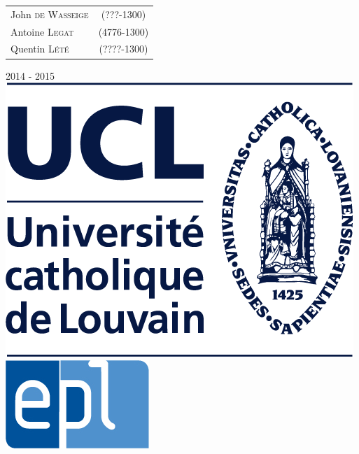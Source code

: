 \begin{titlepage}
		
	\vspace{0.2cm}	
	
      \begin{tabular}{lc}
     John \textsc{de Wasseige} & (???-1300) \\
	Antoine \textsc{Legat} & (4776-1300) \\
	Quentin \textsc{Lété} & (????-1300) \\
      \end{tabular}
      
      \vfill
      





\vfill
{\normalsize 2014 - 2015}\\

  \includegraphics[height = 0.07\textheight]{img/ucl.png} \hfill
  \includegraphics[height = 0.07\textheight]{img/epl.jpg}

\end{titlepage}